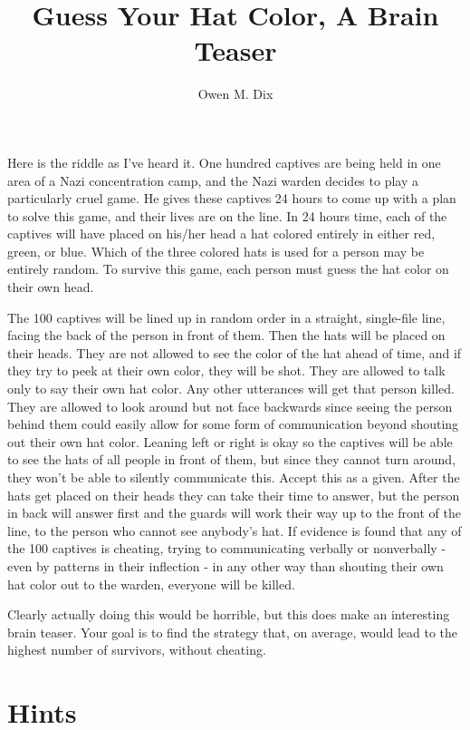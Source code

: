 \documentclass[10pt]{article}
\title{Guess Your Hat Color, A Brain Teaser}
\author{Owen M. Dix}
\date{}
\begin{document}
\maketitle

Here is the riddle as I've heard it. One hundred captives are being held in 
one area of a Nazi concentration camp, and the Nazi warden decides to play a 
particularly cruel game. He gives these captives 24 hours to come up with 
a plan to solve this game, and their lives are on the line. In 24 hours 
time, each of the captives will have placed on his/her head a hat
colored entirely in either red, green, or blue. Which 
of the three colored hats is used for a person may be entirely random. To 
survive this game, each person must guess the hat color on their own head. 

The 100 captives 
will be lined up in random order in a straight, single-file line, 
facing the back of the person in front of them. Then the hats will be placed 
on their heads.
They are not allowed to see the color of the hat ahead of time, and if they 
try to peek at their own color, they will be shot. They are allowed to 
talk only to say their own hat color. Any other utterances will
get that person killed. They are allowed to look around but not 
face backwards since seeing the person behind them could easily 
allow for some form of communication beyond shouting out their 
own hat color. Leaning left or right is okay so the captives will be able to 
see the hats of all people in front of them, but since they cannot turn 
around, they won't be able to silently communicate this. Accept this as a
given. After the hats get placed on their heads they can take their time 
to answer, but the person in back will answer first and the guards will 
work their way up to the front of the line, to the person who cannot see 
anybody's hat. If evidence is found that any of the 100 captives is cheating, 
trying to communicating verbally or nonverbally - even 
by patterns in their inflection - in any other way 
than shouting their own hat color out to the warden, everyone will be killed.

Clearly actually doing this would be horrible,
but this does make an interesting brain teaser. Your goal is to 
find the strategy that, on average, would lead to the highest number of 
survivors, without cheating.

\section{Hints}
\end{document}
